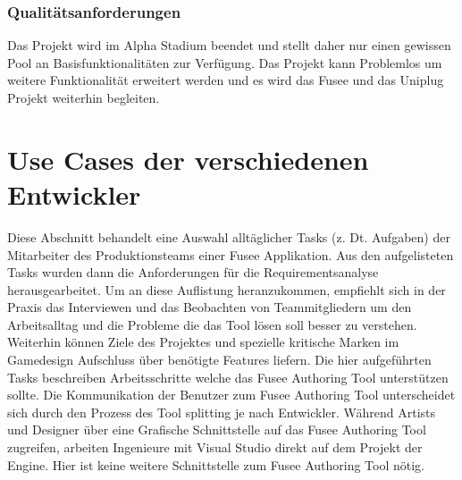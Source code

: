 \documentclass[pagesize, paper=a4, fontsize=12pt, titlepage=true, headings=small, headnosepline, abstractoff, liststotoc, nochapterprefix, plainheadsepline, twoside]{scrreprt}
\begin{document}
\subsubsection{Qualitätsanforderungen}
Das Projekt wird im Alpha Stadium beendet und stellt daher nur einen gewissen Pool an Basisfunktionalitäten zur Verfügung. Das Projekt kann Problemlos um weitere Funktionalität erweitert werden und es wird das Fusee und das Uniplug Projekt weiterhin begleiten.

\section{Use Cases der verschiedenen Entwickler}
Diese Abschnitt behandelt eine Auswahl alltäglicher Tasks (z. Dt. Aufgaben) der Mitarbeiter des Produktionsteams einer Fusee Applikation. Aus den aufgelisteten Tasks wurden dann die Anforderungen für die Requirementsanalyse herausgearbeitet. Um an diese Auflistung heranzukommen, empfiehlt sich in der Praxis das Interviewen und das Beobachten von Teammitgliedern um den Arbeitsalltag und die Probleme die das Tool lösen soll besser zu verstehen. Weiterhin können Ziele des Projektes und spezielle kritische Marken im Gamedesign Aufschluss über benötigte Features liefern.
Die hier aufgeführten Tasks beschreiben Arbeitsschritte welche das Fusee Authoring Tool unterstützen sollte. Die Kommunikation der Benutzer zum Fusee Authoring Tool unterscheidet sich durch den Prozess des Tool splitting je nach Entwickler. Während Artists und Designer über eine Grafische Schnittstelle auf das Fusee Authoring Tool zugreifen, arbeiten Ingenieure mit Visual Studio direkt auf dem Projekt der Engine. Hier ist keine weitere Schnittstelle zum Fusee Authoring Tool nötig.
\end{document}

